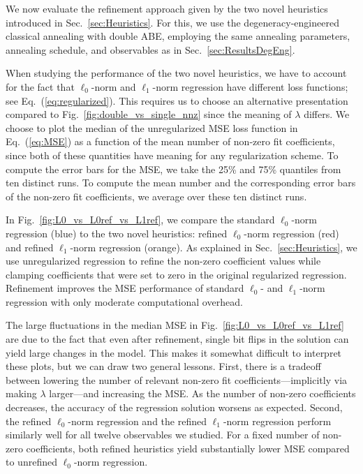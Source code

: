 \documentclass[aps,prd,twocolumn, superscriptaddress,preprintnumbers, nofootinbib,longbibliography,floatfix]{revtex4-2}
\DeclareRobustCommand{\Sec}[1]{Sec.~\ref{#1}}
\DeclareRobustCommand{\Fig}[1]{Fig.~\ref{#1}}
\DeclareRobustCommand{\Eq}[1]{Eq.~(\ref{#1})}
\begin{document}
We now evaluate the refinement approach given by the two novel heuristics introduced in \Sec{sec:Heuristics}.
%
For this, we use the degeneracy-engineered classical annealing with double ABE, employing the same annealing parameters, annealing schedule, and observables as in \Sec{sec:ResultsDegEng}.


When studying the performance of the two novel heuristics, we have to account for the fact that $\ell_0$-norm and $\ell_1$-norm regression have different loss functions; see \Eq{eq:regularized}.
%
This requires us to choose an alternative presentation compared to \Fig{fig:double_vs_single_nnz} since the meaning of $\lambda$ differs.
%
We choose to plot the median of the unregularized MSE loss function in \Eq{eq:MSE} as a function of the mean number of non-zero fit coefficients, since both of these quantities have meaning for any regularization scheme.
%
To compute the error bars for the MSE, we take the 25\% and 75\% quantiles from ten distinct runs.
%
To compute the mean number and the corresponding error bars of the non-zero fit coefficients, we average over these ten distinct runs. 


In \Fig{fig:L0_vs_L0ref_vs_L1ref}, we compare the standard $\ell_0$-norm regression (blue) to the two novel heuristics:  refined $\ell_0$-norm regression (red) and refined $\ell_1$-norm regression (orange). 
%
As explained in \Sec{sec:Heuristics}, we use unregularized regression to refine the non-zero coefficient values while clamping coefficients that were set to zero in the original regularized regression.
%
Refinement improves the MSE performance of standard $\ell_0$- and $\ell_1$-norm regression with only moderate computational overhead.


The large fluctuations in the median MSE in \Fig{fig:L0_vs_L0ref_vs_L1ref} are due to the fact that even after refinement, single bit flips in the solution can yield large changes in the model.
%
This makes it somewhat difficult to interpret these plots, but we can draw two general lessons.
%
First, there is a tradeoff between lowering the number of relevant non-zero fit coefficients---implicitly via making $\lambda$ larger---and increasing the MSE.
%
As the number of non-zero coefficients decreases, the accuracy of the regression solution worsens as expected.
%
Second, the refined $\ell_0$-norm regression and the refined $\ell_1$-norm regression perform similarly well for all twelve observables we studied.
%
For a fixed number of non-zero coefficients, both refined heuristics yield substantially lower MSE compared to unrefined $\ell_0$-norm regression.
\end{document}
